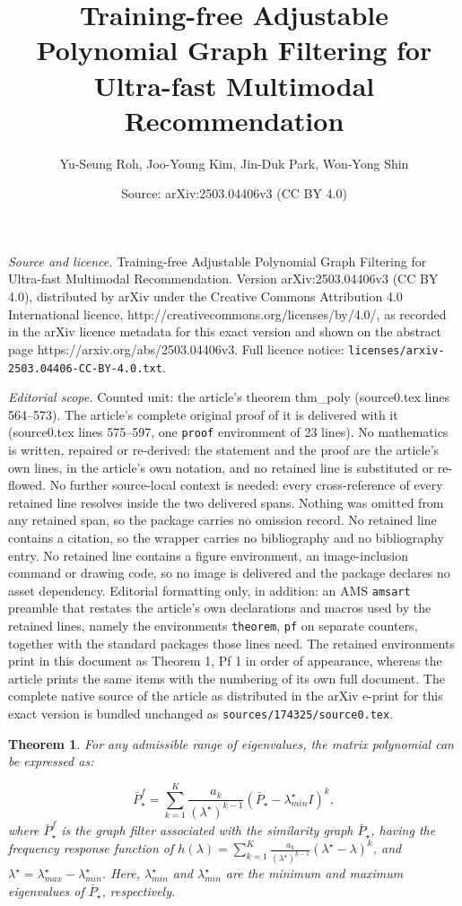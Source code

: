 \documentclass[10pt,a4paper]{amsart}
\title{Training-free Adjustable Polynomial Graph Filtering for Ultra-fast Multimodal Recommendation}
\author{Yu-Seung Roh, Joo-Young Kim, Jin-Duk Park, Won-Yong Shin}
\date{Source: arXiv:2503.04406v3 (CC BY 4.0)}
\newtheorem{theorem}{Theorem}
\begin{document}
\maketitle

\noindent\emph{Source and licence.} Training-free Adjustable Polynomial Graph Filtering for Ultra-fast Multimodal Recommendation. Version arXiv:2503.04406v3 (CC BY 4.0), distributed by arXiv under the Creative Commons Attribution 4.0 International licence, http://creativecommons.org/licenses/by/4.0/, as recorded in the arXiv licence metadata for this exact version and shown on the abstract page https://arxiv.org/abs/2503.04406v3. Full licence notice: \texttt{licenses/arxiv-2503.04406-CC-BY-4.0.txt}.\par\smallskip

\noindent\textit{Editorial scope.} Counted unit: the article's theorem thm\_poly (source0.tex lines 564--573). The article's complete original proof of it is delivered with it (source0.tex lines 575--597, one \texttt{proof} environment of 23 lines). No mathematics is written, repaired or re-derived: the statement and the proof are the article's own lines, in the article's own notation, and no retained line is substituted or re-flowed.  No further source-local context is needed: every cross-reference of every retained line resolves inside the two delivered spans.  Nothing was omitted from any retained span, so the package carries no omission record.  No retained line contains a citation, so the wrapper carries no bibliography and no bibliography entry.  No retained line contains a figure environment, an image-inclusion command or drawing code, so no image is delivered and the package declares no asset dependency.  Editorial formatting only, in addition: an AMS \texttt{amsart} preamble that restates the article's own declarations and macros used by the retained lines, namely the environments \texttt{theorem}, \texttt{pf} on separate counters, together with the standard packages those lines need.  The retained environments print in this document as Theorem 1, Pf 1 in order of appearance, whereas the article prints the same items with the numbering of its own full document.  The complete native source of the article as distributed in the arXiv e-print for this exact version is bundled unchanged as \texttt{sources/174325/source0.tex}.
\begin{theorem}
    \label{thm_poly}
     For any admissible range of eigenvalues, the matrix polynomial can be expressed as:

     \begin{equation}
     \label{poly_filter}
         \bar P ^f_\star = \sum_{k=1}^{K} \frac{a_k}{(\lambda^\star)^{k-1}} (\bar{P}_\star-\lambda_{min}^\star  I)^k,
     \end{equation}
     where $\bar P^f_\star$ is the graph filter associated with the similarity graph $\bar{P}_\star$, having the frequency response function of $h(\lambda)=\sum_{k=1}^K\frac{a_k}{(\lambda^\star)^{k-1}} (\lambda^\star-\lambda)^k$, and $\lambda^\star = \lambda^\star_{max} - \lambda^\star_{min}$. Here, $\lambda^\star_{min}$ and $\lambda^\star_{min}$ are the minimum and maximum eigenvalues of $\bar P_\star$, respectively.
\end{theorem}
\end{document}
